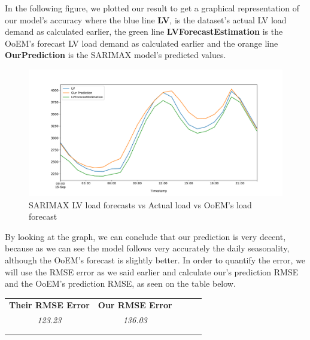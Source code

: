 In the following figure, we plotted our result to get a graphical representation of our model's accuracy where the blue line \textbf{LV}, is the dataset's actual LV load demand as calculated earlier, the green line \textbf{LVForecastEstimation} is the OoEM's forecast LV load demand as calculated earlier and the orange line \textbf{OurPrediction} is the SARIMAX model's predicted values.
\begin{figure}[h!]
\centering
\includegraphics[width=1\linewidth]{project/sarimax.pdf}
\caption{SARIMAX LV load forecasts vs Actual load vs OoEM's load forecast}
\label{fig:felix}
\end{figure}
\par By looking at the graph, we can conclude that our prediction is very decent, because as we can see the model follows very accurately the daily seasonality, although the OoEM's forecast is slightly better. In order to quantify the error, we will use the RMSE error as we said earlier and calculate our's prediction RMSE and the OoEM's prediction RMSE, as seen on the table below.
\begin{table}[h!]
\centering
\begin{tabular}{lllll}
\cline{1-2}
\multicolumn{1}{|l|}{\textbf{Their RMSE Error}} & \multicolumn{1}{l|}{\textbf{Our RMSE Error}} &  &  &  \\ \cline{1-2}
\multicolumn{1}{|c|}{\textit{123.23}} & \multicolumn{1}{c|}{\textit{136.03}} &  &  &  \\ \cline{1-2}
                                &                                &  &  &  \\
                                &                                &  &  & 
\end{tabular}
\end{table}
\newpage 
